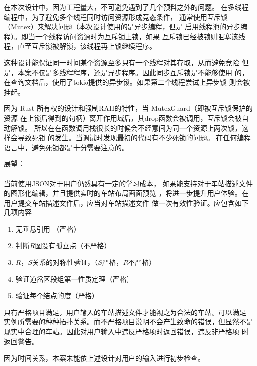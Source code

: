 \begin{keturon}
    在本次设计中，因为工程量大，不可避免遇到了几个预料之外的问题。
    在多线程编程中，为了避免多个线程同时访问资源形成竞态条件，
    通常使用互斥锁（Mutex）来解决问题（本次设计使用的是异步编程，但是
    启用线程池的异步编程）。即当一个线程访问资源时为互斥锁上锁，如果
    互斥锁已经被锁则阻塞该线程，直至互斥锁被解锁，该线程再上锁继续程序。

    这种设计能保证同一时间某个资源至多只有一个线程对其存取，从而避免竞险
    但是，本案不仅是多线程程序，还是异步程序。因此同步互斥锁是不能够使用
    的，在查询文档后，使用了tokio提供的异步锁。如果第二个线程尝试上异步锁
    则会被挂起。

    因为 Rust 所有权的设计和强制RAII的特性，当 MutexGuard（即被互斥锁保护的资源
    在上锁后得到的句柄）离开作用域后，其drop函数会被调用，互斥锁会被自动解锁。
    所以在在函数调用栈很长的时候会不经意间为同一个资源上两次锁，这样会导致死锁
    的发生。当调试时发现最初的代码有不少死锁的问题。
    在任何编程语言中，避免死锁都是十分需要注意的。

    展望：

    \paragraph{} 当前使用JSON对于用户仍然具有一定的学习成本，
    如果能支持对于车站描述文件的图形化编辑，并且提供实时的车站布局画面预览
    ，将进一步提升用户体验。在用户提交车站描述文件后，应当对车站描述文件
    做一次有效性验证。应包含如下几项内容
    \begin{enumerate}[\indent i.]
        \item 无垂悬引用 （严格）
        \item 判断$R$图没有孤立点（不严格）
        \item $R$，$S$关系的对称性验证，（$S$严格，$R$不严格）
        \item 验证道岔区段组第一性质定理（严格）
        \item 验证每个结点的度（严格）
    \end{enumerate}
    只有严格项目满足，用户输入的车站描述文件才能视之为合法的车站。可以满足
    实例所需要的种种拓扑关系。而不严格项目说明不会产生致命的错误，但显然不是
    现实中合理的车站。因此对用户输入中违反严格项时返回错误，违反非严格项
    时返回警告。

    因为时间关系，本案未能依上述设计对用户的输入进行初步检查。



\end{keturon}
